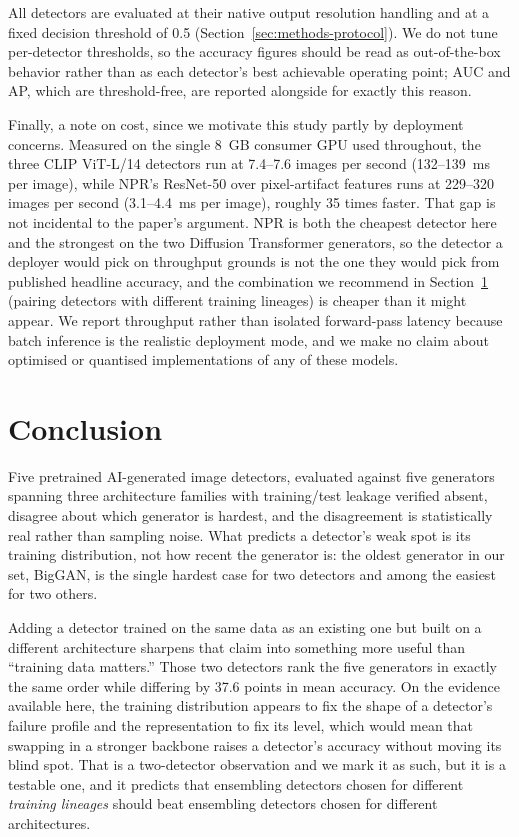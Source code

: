 \documentclass[3p,times,procedia]{elsarticle}
\begin{document}
All detectors are evaluated at their native output resolution handling and
at a fixed decision threshold of 0.5 (Section~\ref{sec:methods-protocol}).
We do not tune per-detector thresholds, so the accuracy figures should be
read as out-of-the-box behavior rather than as each detector's best
achievable operating point; AUC and AP, which are threshold-free, are
reported alongside for exactly this reason.

Finally, a note on cost, since we motivate this study partly by deployment
concerns. Measured on the single 8~GB consumer GPU used throughout, the
three CLIP ViT-L/14 detectors run at 7.4--7.6 images per second
(132--139~ms per image), while NPR's ResNet-50 over pixel-artifact features
runs at 229--320 images per second (3.1--4.4~ms per image), roughly 35 times
faster. That gap is not incidental to the paper's argument. NPR is both the
cheapest detector here and the strongest on the two Diffusion Transformer
generators, so the detector a deployer would pick on throughput grounds is
not the one they would pick from published headline accuracy, and the
combination we recommend in Section~\ref{sec:conclusion} (pairing detectors
with different training lineages) is cheaper than it might appear. We report
throughput rather than isolated forward-pass latency because batch
inference is the realistic deployment mode, and we make no claim about
optimised or quantised implementations of any of these models.

\section{Conclusion}
\label{sec:conclusion}

Five pretrained AI-generated image detectors, evaluated against five
generators spanning three architecture families with training/test leakage
verified absent, disagree about which generator is hardest, and the
disagreement is statistically real rather than sampling noise. What
predicts a detector's weak spot is its training distribution, not how
recent the generator is: the oldest generator in our set, BigGAN, is the
single hardest case for two detectors and among the easiest for two
others.

Adding a detector trained on the same data as an existing one but built on
a different architecture sharpens that claim into something more useful
than ``training data matters.'' Those two detectors rank the five
generators in exactly the same order while differing by 37.6 points in
mean accuracy. On the evidence available here, the training distribution
appears to fix the shape of a detector's failure profile and the
representation to fix its level, which would mean that swapping in a
stronger backbone raises a detector's accuracy without moving its blind
spot. That is a two-detector observation and we mark it as such, but it is
a testable one, and it predicts that ensembling detectors chosen for
different \emph{training lineages} should beat ensembling detectors chosen
for different architectures.
\end{document}
